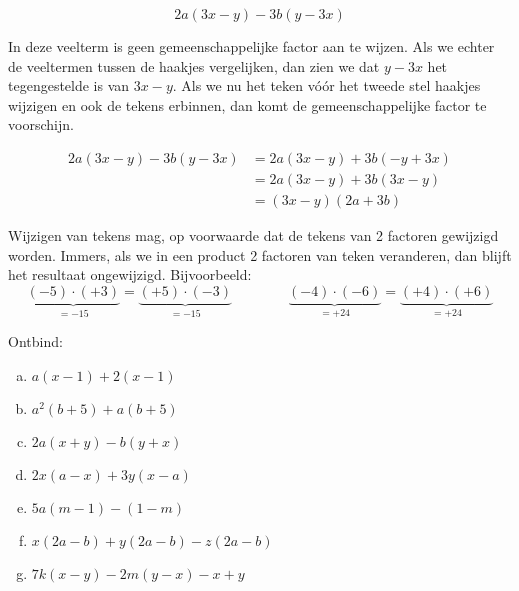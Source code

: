 \documentclass[12pt]{article}
\begin{document}
\begin{voorbeeld}
$$2a (3x - y) - 3b (y - 3x)$$

In deze veelterm is geen gemeenschappelijke factor aan te wijzen. Als we echter de veeltermen tussen de haakjes vergelijken, dan zien we dat $y - 3x$ het tegengestelde is van $3x - y$. Als we nu het teken vóór het tweede stel haakjes wijzigen en ook de tekens erbinnen, dan komt de gemeenschappelijke factor te voorschijn.

\begin{align*}
  2a (3x - y) - 3b (y - 3x) &= 2a (3x - y) + 3b (- y + 3x)\\
                            &= 2a (3x - y) + 3b (3x - y)\\
                            &= (3x - y) (2a + 3b)
\end{align*}

Wijzigen van tekens mag, op voorwaarde dat de tekens van 2 factoren gewijzigd worden. Immers, als we in een product 2 factoren van teken veranderen, dan blijft het resultaat ongewijzigd. Bijvoorbeeld:
$$\underbrace{(-5)\cdot(+3)}_{=-15}=\underbrace{(+5)\cdot(-3)}_{=-15} \qquad\qquad
  \underbrace{(-4)\cdot(-6)}_{=+24}=\underbrace{(+4)\cdot(+6)}_{=+24}$$
\end{voorbeeld}

\begin{exercise}
Ontbind:
\begin{enumerate}[(a)]
  \item $a (x - 1) + 2 (x - 1)$
  \item $a^2 (b + 5) + a (b + 5)$
  \item $2a (x + y) - b (y + x)$
  \item $2x (a - x) + 3y (x - a)$
  \item $5a (m - 1) - (1 - m)$
  \item $x (2a - b) + y (2a - b) - z (2a - b)$
  \item $7k (x - y) - 2m (y - x) - x + y$
\end{enumerate}
\end{exercise}
\end{document}
